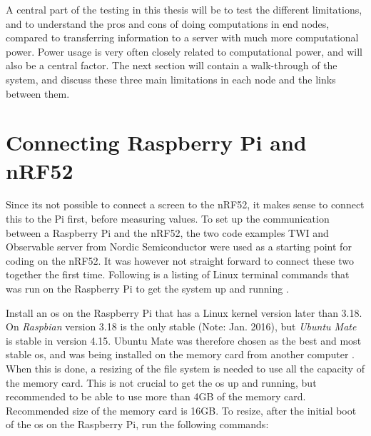 

\noindent A central part of the testing in this thesis will be to test the different limitations, and to understand the pros and cons of doing computations in end nodes, compared to transferring  information to a server with much more computational power. Power usage is very often closely related to computational power, and will also be a central factor. The next section will contain a walk-through of the system, and discuss these three main limitations in each node and the links between them.


\section{Connecting Raspberry Pi and nRF52}


\noindent Since its not possible to connect a screen to the \gls{nRF52}, it makes sense to connect this to the Pi first, before measuring values. To set up the communication between a \gls{Raspberry Pi} and the \gls{nRF52}, the two code examples TWI and Observable server from Nordic Semiconductor were used as a starting point for coding on the nRF52. It was however not straight forward to connect these two together the first time. Following is a listing of Linux terminal commands that was run on the \gls{Raspberry Pi} to get the system up and running \cite{nordicNrfDocumentation}. 

\noindent Install an \gls{os} on the Raspberry Pi that has a Linux kernel version later than 3.18. On \textit{Raspbian} version 3.18 is the only stable (Note: Jan. 2016), but \textit{Ubuntu Mate} is stable in version 4.15. Ubuntu Mate was therefore chosen as the best and most stable \gls{os}, and was being installed on the memory card from another computer \cite{ubuntuMate}. When this is done, a resizing of the file system is needed to use all the capacity of the memory card. This is not crucial to get the \gls{os} up and running, but recommended to be able to use more than 4GB of the memory card. Recommended size of the memory card is 16GB. To resize, after the initial boot of the \gls{os} on the \gls{Raspberry Pi}, run the following commands: 

